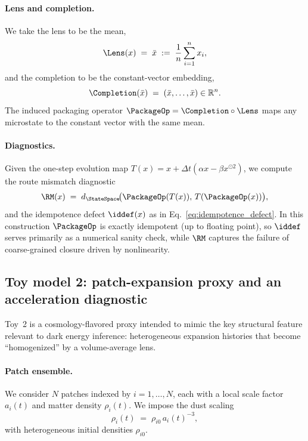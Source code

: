 \documentclass[11pt]{article}
\theoremstyle{definition}
\theoremstyle{plain}
\theoremstyle{remark}
\begin{document}
\paragraph{Lens and completion.}
We take the lens to be the mean,
\begin{equation}
\Lens(x) \;=\; \bar{x} \;:=\; \frac{1}{n}\sum_{i=1}^n x_i,
\label{eq:toy1_lens_mean}
\end{equation}
and the completion to be the constant-vector embedding,
\begin{equation}
\Completion(\bar{x}) \;=\; (\bar{x},\ldots,\bar{x}) \in \mathbb{R}^n.
\label{eq:toy1_completion_const}
\end{equation}
The induced packaging operator $\PackageOp=\Completion\circ\Lens$ maps any microstate to the constant vector with the same mean.

\paragraph{Diagnostics.}
Given the one-step evolution map $T(x)=x+\Delta t(\alpha x-\beta x^{\odot 2})$, we compute the route mismatch diagnostic
\begin{equation}
\RM(x) \;=\; d_{\StateSpace}\!\big(\PackageOp(T(x)),\,T(\PackageOp(x))\big),
\label{eq:toy1_rm}
\end{equation}
and the idempotence defect $\iddef(x)$ as in Eq.~\eqref{eq:idempotence_defect}.
In this construction $\PackageOp$ is exactly idempotent (up to floating point), so $\iddef$ serves primarily as a numerical sanity check, while $\RM$ captures the failure of coarse-grained closure driven by nonlinearity.

\subsection{Toy model 2: patch-expansion proxy and an acceleration diagnostic}\label{sec:methods:toy2}
Toy~2 is a cosmology-flavored proxy intended to mimic the key structural feature relevant to dark energy inference: heterogeneous expansion histories that become ``homogenized'' by a volume-average lens.

\paragraph{Patch ensemble.}
We consider $N$ patches indexed by $i=1,\ldots,N$, each with a local scale factor $a_i(t)$ and matter density $\rho_i(t)$.
We impose the dust scaling
\begin{equation}
\rho_i(t) \;=\; \rho_{i0}\,a_i(t)^{-3},
\label{eq:toy2_rho_scaling}
\end{equation}
with heterogeneous initial densities $\rho_{i0}$.
\end{document}
